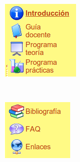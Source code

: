 \begin{figure}
        \centering
        \begin{subfigure}[b]{0.3\textwidth}
                \includegraphics[width=\textwidth]{fig/inte_asig1}
                \label{fig:inte_asig1}
        \end{subfigure}%
        ~ %
        \begin{subfigure}[b]{0.3\textwidth}
                \includegraphics[width=\textwidth]{fig/inte_asig2}

\end{subfigure}
\end{figure}
